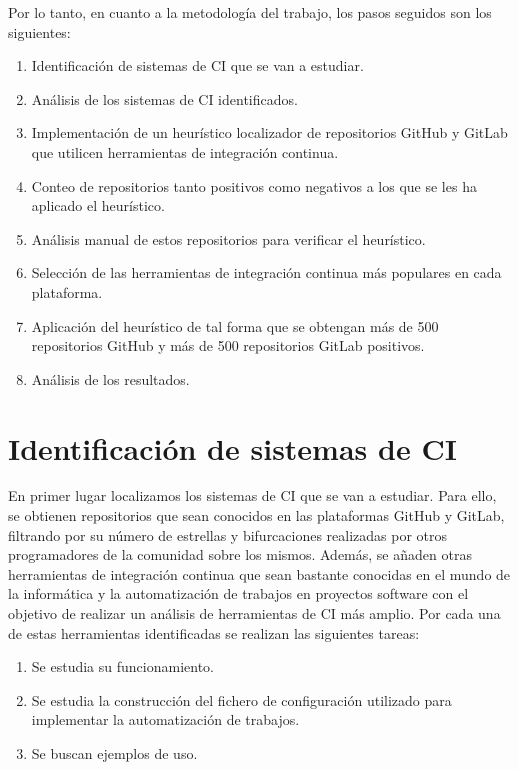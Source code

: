 Por lo tanto, en cuanto a la metodología del trabajo, los pasos seguidos son los siguientes:
\begin{enumerate}
    \item Identificación de sistemas de CI que se van a estudiar.
    \item Análisis de los sistemas de CI identificados.
    \item Implementación de un heurístico localizador de repositorios GitHub y GitLab que utilicen herramientas de integración continua.
    \item Conteo de repositorios tanto positivos como negativos a los que se les ha aplicado el heurístico.
    \item Análisis manual de estos repositorios para verificar el heurístico.
    \item Selección de las herramientas de integración continua más populares en cada plataforma.
    \item Aplicación del heurístico de tal forma que se obtengan más de 500 repositorios GitHub y más de 500 repositorios GitLab positivos.
    \item Análisis de los resultados.
\end{enumerate}

\section{Identificación de sistemas de CI}

En primer lugar localizamos los sistemas de CI que se van a estudiar. Para ello, se obtienen repositorios que sean conocidos en las plataformas GitHub y GitLab, filtrando por su número de estrellas y bifurcaciones realizadas por otros programadores de la comunidad sobre los mismos. Además, se añaden otras herramientas de integración continua que sean bastante conocidas en el mundo de la informática y la automatización de trabajos en proyectos software con el objetivo de realizar un análisis de herramientas de CI más amplio.
Por cada una de estas herramientas identificadas se realizan las siguientes tareas:
\begin{enumerate}
    \item Se estudia su funcionamiento.
    \item Se estudia la construcción del fichero de configuración utilizado para implementar la automatización de trabajos.
    \item Se buscan ejemplos de uso.
\end{enumerate}

